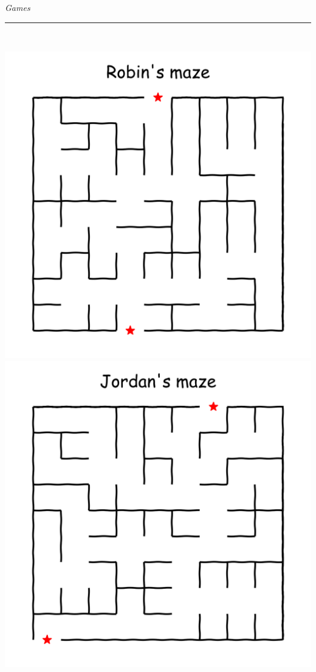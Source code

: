 \documentclass[landscape]{article}
\renewcommand\headline[1]{\begin{center} {\huge \textsl{ #1}}\\ %
			\rule[5pt]{0.8\hsize}{0.5pt}\\ \end{center}}
\begin{document}
\begin{multicols}{3}
\headline{Games}
\center\includegraphics[width=0.49\linewidth]{images/maze_r.png}\includegraphics[width=0.49\linewidth]{images/maze_j.png}

\renewcommand*\sudokuformat[1]{\sffamily#1}
\setlength\sudokusize{4cm}
\setlength\sudokuthickline{1pt}
\begin{center}
	
\end{center}

\end{multicols}
\end{document}
